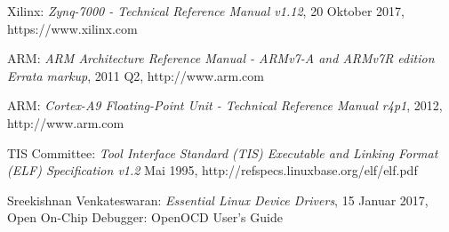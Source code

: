 
\begingroup
\begin{thebibliography}{99}




	Xilinx:
	\emph{Zynq-7000 - Technical Reference Manual v1.12},
	20 Oktober 2017, https://www.xilinx.com

	ARM:
	\emph{ARM Architecture Reference Manual - ARMv7-A and ARMv7R edition Errata markup},
	2011 Q2, http://www.arm.com

	ARM:
	\emph{Cortex-A9 Floating-Point Unit - Technical Reference Manual r4p1},
	2012, http://www.arm.com


	TIS Committee:
	\emph{Tool Interface Standard (TIS) Executable and Linking Format (ELF) Specification v1.2}
	Mai 1995, http://refspecs.linuxbase.org/elf/elf.pdf

	
	Sreekishnan Venkateswaran:
	\emph{Essential Linux Device Drivers},
	15 Januar 2017, Open On-Chip Debugger: OpenOCD User's Guide









	\end{thebibliography}
\endgroup